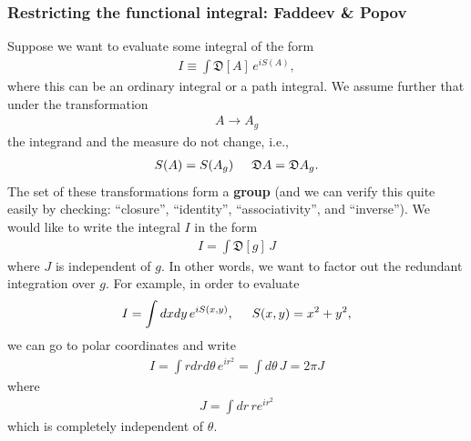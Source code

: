 \documentclass{book}
\theoremstyle{definition}
\begin{document}
\subsubsection{Restricting the functional integral: Faddeev \& Popov}


Suppose we want to evaluate some integral of the form
\begin{align}
I \equiv \int \mathfrak{D}[A]\,e^{iS(A)},
\end{align}
where this can be an ordinary integral or a path integral. We assume further that under the transformation
\begin{align}
A \to A_g 
\end{align}
the integrand and the measure do not change, i.e.,
\begin{align}
S(A) = S(A_g) \hspace{0.5cm} \mathfrak{D}A = \mathfrak{D}A_g.
\end{align}
The set of these transformations form a \textbf{group} (and we can verify this quite easily by checking: ``closure'', ``identity'', ``associativity'', and ``inverse''). We would like to write the integral $I$ in the form 
\begin{align}
I = \int \mathfrak{D}[g]\, J 
\end{align}
where $J$ is independent of $g$. In other words, we want to factor out the redundant integration over $g$. For example, in order to evaluate
\begin{align}
I = \int dxdy\, e^{iS(x,y)}, \hspace{0.5cm} S(x,y) = x^2 + y^2,
\end{align}
we can go to polar coordinates and write
\begin{align}
I = \int rdrd\theta\, e^{ir^2} = \int d\theta\, J = 2\pi J
\end{align}
where
\begin{align}
J = \int dr\,re^{ir^2}
\end{align}
which is completely independent of $\theta$. \\
 
\end{document}
